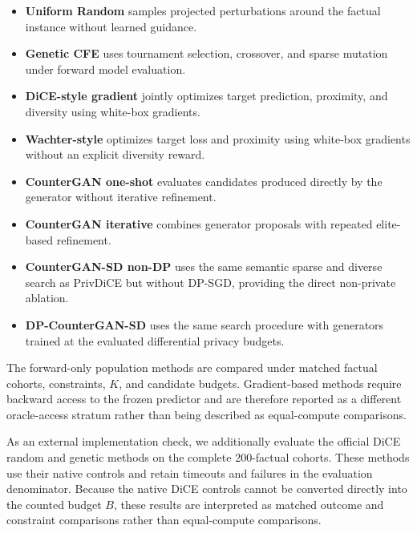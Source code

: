 \documentclass[preprint,12pt]{elsarticle}
\begin{document}
\begin{itemize}
    \item \textbf{Uniform Random} samples projected perturbations around the
    factual instance without learned guidance.

    \item \textbf{Genetic CFE} uses tournament selection, crossover, and sparse
    mutation under forward model evaluation.

    \item \textbf{DiCE-style gradient} jointly optimizes target prediction,
    proximity, and diversity using white-box gradients.

    \item \textbf{Wachter-style} optimizes target loss and proximity using
    white-box gradients without an explicit diversity reward.

    \item \textbf{CounterGAN one-shot} evaluates candidates produced directly
    by the generator without iterative refinement.

    \item \textbf{CounterGAN iterative} combines generator proposals with
    repeated elite-based refinement.

    \item \textbf{CounterGAN-SD non-DP} uses the same semantic sparse and
    diverse search as PrivDiCE but without DP-SGD, providing the direct
    non-private ablation.

    \item \textbf{DP-CounterGAN-SD} uses the same search procedure with
    generators trained at the evaluated differential privacy budgets.
\end{itemize}

The forward-only population methods are compared under matched factual cohorts,
constraints, $K$, and candidate budgets. Gradient-based methods require
backward access to the frozen predictor and are therefore reported as a
different oracle-access stratum rather than being described as equal-compute
comparisons.

As an external implementation check, we additionally evaluate the official
DiCE random and genetic methods on the complete 200-factual cohorts. These
methods use their native controls and retain timeouts and failures in the
evaluation denominator. Because the native DiCE controls cannot be converted
directly into the counted budget $B$, these results are interpreted as matched
outcome and constraint comparisons rather than equal-compute comparisons.
\end{document}

